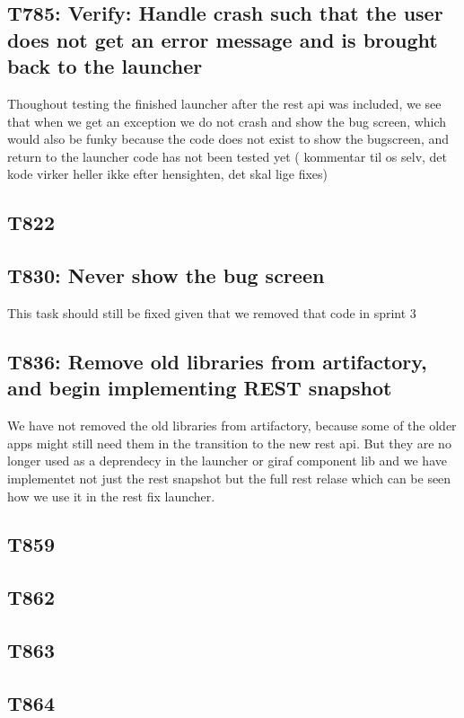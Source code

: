 \subsection{T785: Verify: Handle crash such that the user does not get an error message and
is brought back to the launcher}
Thoughout testing the finished launcher after the rest api was included, we see
that when we get an exception we do not crash and show the bug screen, which
would also be funky because the code does not exist to show the bugscreen, and
return to the launcher code has not been tested yet ( kommentar til os selv,
det kode virker heller ikke efter hensighten, det skal lige fixes)

\subsection{T822}

\subsection{T830: Never show the bug screen}
This task should still be fixed given that we removed that code in sprint 3

\subsection{T836: Remove old libraries from artifactory, and begin implementing REST
snapshot}
We have not removed the old libraries from artifactory, because some of the
older apps might still need them in the transition to the new rest api. But they
are no longer used as a deprendecy in the launcher or giraf component lib and we
have implementet not just the rest snapshot but the full rest relase which can
be seen how we use it in the rest fix launcher.

\subsection{T859}

\subsection{T862}

\subsection{T863}

\subsection{T864}

